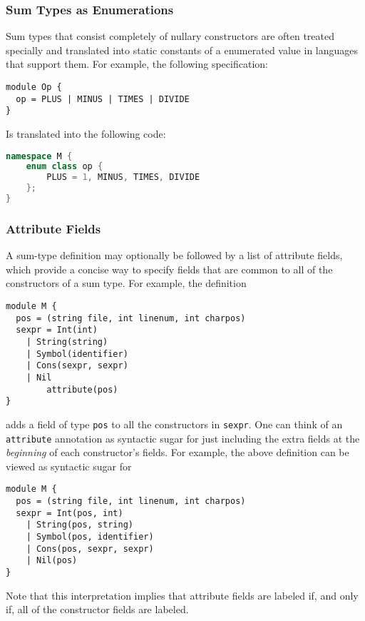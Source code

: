 \subsubsection{Sum Types as Enumerations}
\label{sec:enumerations}

Sum types that consist completely of nullary constructors
are often treated specially and translated into static constants of a
enumerated value in languages that support them.
For example, the following \asdl{} specification:
%
\begin{code}\begin{lstlisting}[language=ASDL]
module Op {
  op = PLUS | MINUS | TIMES | DIVIDE
}
\end{lstlisting}\end{code}%
%
Is translated into the following \Cplusplus{} code:
%
\begin{code}\begin{lstlisting}[language=c++]
namespace M {
    enum class op {
        PLUS = 1, MINUS, TIMES, DIVIDE
    };
}
\end{lstlisting}\end{code}%

\subsubsection{Attribute Fields}
A sum-type definition may optionally be followed by a list of attribute fields, which
provide a concise way to specify fields that are common to all of the constructors
of a sum type.
For example, the definition
%
\begin{code}\begin{lstlisting}[language=ASDL]
module M {
  pos = (string file, int linenum, int charpos)
  sexpr = Int(int)
	| String(string)
	| Symbol(identifier)
	| Cons(sexpr, sexpr)
	| Nil
        attribute(pos)
}
\end{lstlisting}\end{code}%
adds a field of type \lstinline[language=ASDL]!pos! to all the constructors
in \lstinline[language=ASDL]!sexpr!.
One can think of an \lstinline!attribute! annotation as syntactic sugar for just including
the extra fields at the \emph{beginning} of each constructor's fields.
For example, the above definition can be viewed as syntactic sugar for
%
\begin{code}\begin{lstlisting}[language=ASDL]
module M {
  pos = (string file, int linenum, int charpos)
  sexpr = Int(pos, int)
	| String(pos, string)
	| Symbol(pos, identifier)
	| Cons(pos, sexpr, sexpr)
	| Nil(pos)
}
\end{lstlisting}\end{code}%
Note that this interpretation implies that attribute fields are labeled if, and only if, all
of the constructor fields are labeled.

